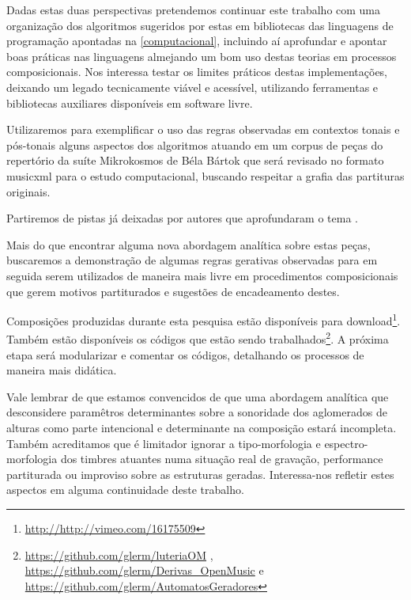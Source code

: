 \documentclass[
	12pt,				%
	openright,			%
	twoside,			%
	a4paper,			%
	english,			%
	french,				%
	spanish,			%
	brazil				%
	]{abntex2}
\begin{document}
Dadas estas duas perspectivas pretendemos continuar este trabalho com uma organização dos algoritmos sugeridos por estas em bibliotecas das linguagens de programação apontadas na \autoref{computacional}, incluindo aí aprofundar e apontar boas práticas nas linguagens almejando um bom uso destas teorias em processos composicionais. Nos interessa testar os limites práticos destas implementações, deixando um legado tecnicamente viável e acessível, utilizando ferramentas e bibliotecas auxiliares disponíveis em software livre.

Utilizaremos para exemplificar o uso das regras observadas em contextos tonais e pós-tonais alguns aspectos dos algoritmos atuando em um corpus de peças do repertório da suíte Mikrokosmos de Béla Bártok que será revisado no formato musicxml para o estudo computacional, buscando respeitar a grafia das partituras originais. 

Partiremos de pistas já deixadas por autores que aprofundaram o tema \cite{marshall1946analysis,suchoff1971guide, lendvai1971bela,antokoletz1984music,suchoff2004bartok,lester1989analytic}.

Mais do que encontrar alguma nova abordagem analítica sobre estas peças, buscaremos a demonstração de algumas regras gerativas observadas para em seguida serem utilizados de maneira mais livre em procedimentos composicionais que gerem motivos partiturados e sugestões de encadeamento destes.

Composições produzidas durante esta pesquisa estão disponíveis para download\footnote{\url{http://http://vimeo.com/16175509}}. Também estão disponíveis os códigos que estão sendo trabalhados\footnote{\url{https://github.com/glerm/luteriaOM} , \url{https://github.com/glerm/Derivas_OpenMusic} e \url{https://github.com/glerm/AutomatosGeradores} }. A próxima etapa será modularizar e comentar os códigos, detalhando os processos de maneira mais didática.

Vale lembrar de que estamos convencidos de que uma abordagem analítica que desconsidere paramêtros determinantes sobre a sonoridade\cite{guigue2012} dos aglomerados de alturas como parte intencional e determinante na composição estará incompleta. Também acreditamos que é limitador ignorar a tipo-morfologia\cite{shaeffer1966traite} e espectro-morfologia\cite{smalley1997spectromorphology} dos timbres atuantes numa situação real de gravação, performance partiturada ou improviso sobre as estruturas geradas. Interessa-nos refletir estes aspectos em alguma continuidade deste trabalho.
\end{document}
